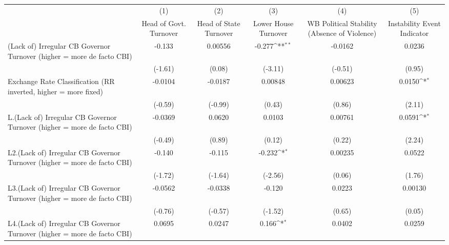 {
\def\sym#1{\ifmmode^{#1}\else\(^{#1}\)\fi}
\begin{longtable}{l*{5}{c}}
\hline\hline\endfirsthead\hline\endhead\hline\endfoot\endlastfoot
                &\multicolumn{1}{c}{(1)}&\multicolumn{1}{c}{(2)}&\multicolumn{1}{c}{(3)}&\multicolumn{1}{c}{(4)}&\multicolumn{1}{c}{(5)}\\
                &\multicolumn{1}{c}{Head of Govt. Turnover}&\multicolumn{1}{c}{Head of State Turnover}&\multicolumn{1}{c}{Lower House Turnover}&\multicolumn{1}{c}{WB Political Stability (Absence of Violence)}&\multicolumn{1}{c}{Instability Event Indicator}\\
\hline
(Lack of) Irregular CB Governor Turnover (higher = more de facto CBI)&   -0.133         &  0.00556         &   -0.277\sym{**} &  -0.0162         &   0.0236         \\
                &  (-1.61)         &   (0.08)         &  (-3.11)         &  (-0.51)         &   (0.95)         \\
[1em]
Exchange Rate Classification (RR inverted, higher = more fixed)&  -0.0104         &  -0.0187         &  0.00848         &  0.00623         &   0.0150\sym{*}  \\
                &  (-0.59)         &  (-0.99)         &   (0.43)         &   (0.86)         &   (2.11)         \\
[1em]
L.(Lack of) Irregular CB Governor Turnover (higher = more de facto CBI)&  -0.0369         &   0.0620         &   0.0103         &  0.00761         &   0.0591\sym{*}  \\
                &  (-0.49)         &   (0.89)         &   (0.12)         &   (0.22)         &   (2.24)         \\
[1em]
L2.(Lack of) Irregular CB Governor Turnover (higher = more de facto CBI)&   -0.140         &   -0.115         &   -0.232\sym{*}  &  0.00235         &   0.0522         \\
                &  (-1.72)         &  (-1.64)         &  (-2.56)         &   (0.06)         &   (1.76)         \\
[1em]
L3.(Lack of) Irregular CB Governor Turnover (higher = more de facto CBI)&  -0.0562         &  -0.0338         &   -0.120         &   0.0223         &  0.00130         \\
                &  (-0.76)         &  (-0.57)         &  (-1.52)         &   (0.65)         &   (0.05)         \\
[1em]
L4.(Lack of) Irregular CB Governor Turnover (higher = more de facto CBI)&   0.0695         &   0.0247         &    0.166\sym{*}  &   0.0402         &   0.0259         \\

\end{longtable}}
